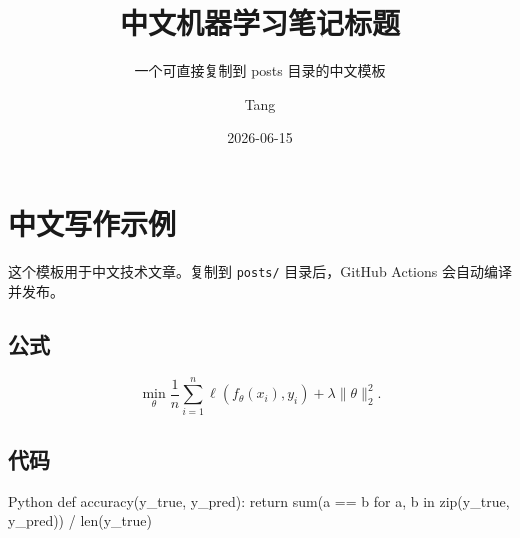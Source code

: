 \documentclass[cn,nofont,11pt]{elegantbook}
\title{中文机器学习笔记标题}
\subtitle{一个可直接复制到 posts 目录的中文模板}
\author{Tang}
\institute{Tang's Machine Learning Blog}
\date{2026-06-15}
\begin{document}
\maketitle
\frontmatter
\tableofcontents
\mainmatter

\chapter{中文写作示例}

这个模板用于中文技术文章。复制到 \verb|posts/| 目录后，GitHub Actions 会自动编译并发布。

\section{公式}

\[
  \min_{\theta} \frac{1}{n}\sum_{i=1}^{n}\ell(f_{\theta}(x_i), y_i)
  + \lambda\|\theta\|_2^2.
\]

\section{代码}

\begin{codeblock}{Python}
def accuracy(y_true, y_pred):
    return sum(a == b for a, b in zip(y_true, y_pred)) / len(y_true)
\end{codeblock}
\end{document}
